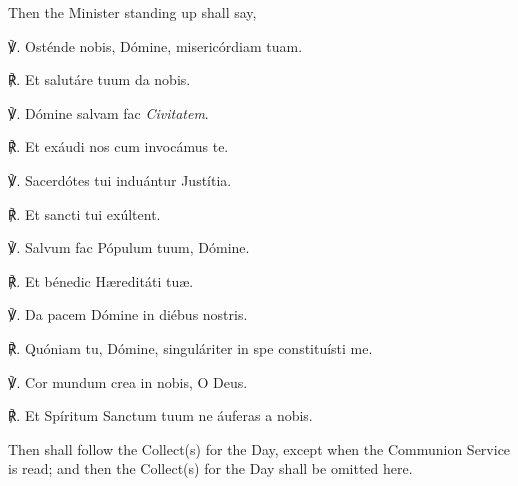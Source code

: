 \vspace{-0.5ex}
\begin{rubric}
    Then the Minister standing up shall say,
\end{rubric}
℣. Osténde nobis, Dómine, misericórdiam tuam.\par
℟. Et salutáre tuum da nobis.\par
℣. Dómine salvam fac \textit{Civitatem}.\par
℟. Et exáudi nos cum invocámus te.\par
℣. Sacerdótes tui induántur Justítia.\par
℟. Et sancti tui exúltent.\par
℣. Salvum fac Pópulum tuum, Dómine.\par
℟. Et bénedic H{\ae}reditáti tu{\ae}.\par
℣. Da pacem Dómine in diébus nostris.\par
℟. Quóniam tu, Dómine, singuláriter in spe constituísti me.\par
℣. Cor mundum crea in nobis, O Deus.\par
℟. Et Spíritum Sanctum tuum ne áuferas a nobis.
\begin{rubric}
Then shall follow the Collect(s) for the Day, except when the Communion Service is read; and then the Collect(s) for the Day shall be omitted here.
\end{rubric}
